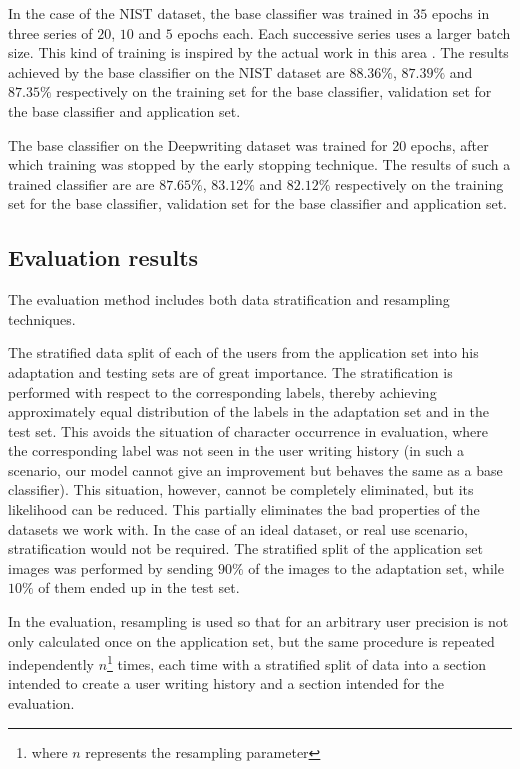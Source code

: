 \documentclass{article}
\begin{document}
In the case of the NIST dataset, the base classifier was trained in $35$ epochs in three series of $20$, $10$ and $5$ epochs each.
Each successive series uses a larger batch size.
This kind of training is inspired by the actual work in this area \citep{lrbs}.
The results achieved by the base classifier on the NIST dataset are $88.36\%$, $87.39\%$ and $87.35\%$ respectively on the training set for the base classifier, validation set for the base classifier and application set.

The base classifier on the Deepwriting dataset was trained for 20 epochs, after which training was stopped by the early stopping technique.
The results of such a trained classifier are are $87.65\%$, $83.12\%$ and $82.12\%$ respectively on the training set for the base classifier, validation set for the base classifier and application set.

\subsection{Evaluation results}

The evaluation method includes both data stratification and resampling techniques.

The stratified data split of each of the users from the application set into his adaptation and testing sets are of great importance.
The stratification is performed with respect to the corresponding labels, thereby achieving approximately equal distribution of the labels in the adaptation set and in the test set.
This avoids the situation of character occurrence in evaluation, where the corresponding label was not seen in the user writing history
(in such a scenario, our model cannot give an improvement but behaves the same as a base classifier).
This situation, however, cannot be completely eliminated, but its likelihood can be reduced.
This partially eliminates the bad properties of the datasets we work with.
In the case of an ideal dataset, or real use scenario, stratification would not be required.
The stratified split of the application set images was performed by sending $90\%$ of the images to the adaptation set, while $10\%$ of them ended up in the test set.

In the evaluation, resampling is used so that for an arbitrary user precision is not only calculated once on the application set, but the same procedure is repeated
independently $n$\footnote{where $n$ represents the resampling parameter} times,
each time with a stratified split of data into a section intended to create a user writing history and a section intended for the evaluation.
\end{document}
